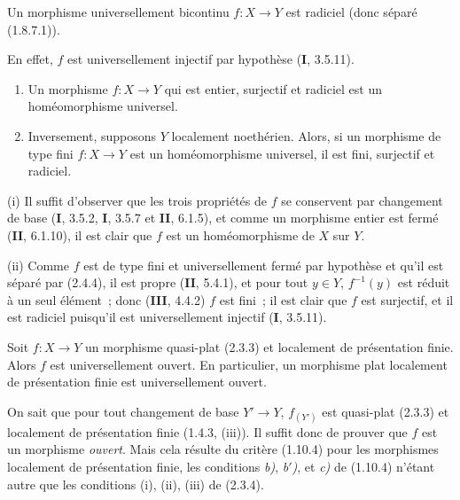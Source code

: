 \begin{proposition}[2.4.4]
\label{IV.2.4.4-fr}
Un morphisme universellement bicontinu $f:X\to Y$ est radiciel (donc séparé
\textup{(1.8.7.1)}).
\end{proposition}

En effet, $f$ est universellement injectif par hypothèse (\textbf{I}, 3.5.11).

\begin{proposition}[2.4.5]
\begin{enumerate}
\item[\textup{(i)}] Un morphisme $f:X\to Y$ qui est entier, surjectif et radiciel est
un homéomorphisme universel.
\item[\textup{(ii)}] Inversement, supposons $Y$ localement noethérien. Alors, si un
morphisme de type fini $f:X\to Y$ est un homéomorphisme universel, il est
fini, surjectif et radiciel.
\end{enumerate}
\end{proposition}

(i) Il suffit d'observer que les trois propriétés de $f$ se conservent par
changement de base (\textbf{I}, 3.5.2, \textbf{I}, 3.5.7 et \textbf{II}, 6.1.5), et comme un morphisme
entier est fermé (\textbf{II}, 6.1.10), il est clair que $f$ est un homéomorphisme de
$X$ sur $Y$.

(ii) Comme $f$ est de type fini et universellement fermé par hypothèse et
qu'il est séparé par (2.4.4), il est propre (\textbf{II}, 5.4.1), et pour tout
$y\in Y$, $f^{-1}(y)$ est réduit à un seul élément~; donc (\textbf{III}, 4.4.2) $f$
est fini~; il est clair que $f$ est surjectif, et il est radiciel puisqu'il
est universellement injectif (\textbf{I}, 3.5.11).

\begin{theorem}[2.4.6]
\label{IV.2.4.6-fr}
Soit $f:X\to Y$ un morphisme quasi-plat \textup{(2.3.3)} et localement de présentation
finie. Alors $f$ est universellement ouvert. En particulier, un morphisme plat
localement de présentation finie est universellement ouvert.
\end{theorem}

On sait que pour tout changement de base $Y'\to Y$, $f_{(Y')}$ est
quasi-plat (2.3.3) et localement de présentation finie (1.4.3, (iii)). Il
suffit donc de prouver que $f$ est un
morphisme \emph{ouvert}. Mais cela résulte du critère (1.10.4) pour les morphismes
localement de présentation finie, les conditions \emph{b)}, \emph{b$'$)}, et
\emph{c)} de (1.10.4) n'étant autre que les conditions (i), (ii), (iii) de
(2.3.4).

